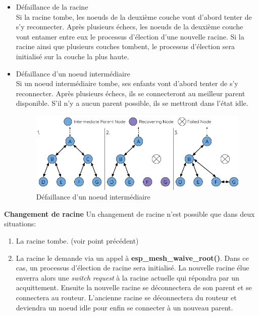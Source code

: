             \begin{itemize}
                \item Défaillance de la racine\\
                    Si la racine tombe, les noeuds de la deuxième couche vont d'abord tenter de s'y reconnecter.
                    Après plusieurs échecs, les noeuds de la deuxième couche vont entamer entre eux le processus d'élection d'une nouvelle racine.
                    Si la racine ainsi que plusieurs couches tombent, le processus d'élection sera initialisé sur la couche la plus haute.


                \item Défaillance d'un noeud intermédiaire\\
                    Si un noeud intermédiaire tombe, ses enfants vont d'abord tenter de s'y reconnecter.
                    Après plusieurs échecs, ils se connecteront au meilleur parent disponible.
                    S'il n'y a aucun parent possible, ils se mettront dans l'état idle.
                    \begin{figure}[H]
                        \centering
                        \includegraphics[scale=0.5]{images/mesh-parent-node-failure.png}
                        \caption{Défaillance d'un noeud intermédiaire\cite{esp-mesh_w}}
                    \end{figure}
            \end{itemize}
            \vspace{0.5cm}
            \textbf{Changement de racine}\newline
                Un changement de racine n'est possible que dans deux situations:
                \begin{enumerate}
                    \item La racine tombe. (voir point précédent)
                    \item La racine le demande via un appel à \textbf{esp\_mesh\_waive\_root()}.
                        Dans ce cas, un processus d'élection de racine sera initialisé. La nouvelle racine élue
                        enverra alors une \textit{switch request} à la racine actuelle qui répondra par un acquittement.
                        Ensuite la nouvelle racine se déconnectera de son parent et se connectera au routeur.
                        L'ancienne racine se déconnectera du routeur et deviendra un noeud idle pour enfin se connecter à un nouveau parent.
                \end{enumerate}
